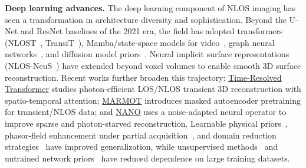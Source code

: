\textbf{Deep learning advances.}
The deep learning component of NLOS imaging has seen a transformation in architecture diversity and sophistication. Beyond the U-Net and ResNet baselines of the 2021 era, the field has adopted transformers (NLOST~\cite{liNLOST2023}, TransiT~\cite{liTransiT2025}), Mamba/state-space models for video~\cite{liMambaTemporalConsistency2024}, graph neural networks~\cite{suDGNLOS2025}, and diffusion model priors~\cite{suModelGuidedDiffusion2024}. Neural implicit surface representations (NLOS-NeuS~\cite{fujimuraNLOSNeuS2023}) have extended beyond voxel volumes to enable smooth 3D surface reconstruction. Recent works further broaden this trajectory: \href{https://arxiv.org/abs/2510.09205}{Time-Resolved Transformer} studies photon-efficient LOS/NLOS transient 3D reconstruction with spatio-temporal attention; \href{https://arxiv.org/abs/2506.08470}{MARMOT} introduces masked autoencoder pretraining for transient/NLOS data; and \href{https://arxiv.org/abs/2508.09655}{NANO} uses a noise-adapted neural operator to improve sparse and photon-starved reconstruction. Learnable physical priors~\cite{sunGeneralizable2025}, phasor-field enhancement under partial acquisition~\cite{choLEAP2024}, and domain reduction strategies~\cite{shimDomainReduction2024} have improved generalization, while unsupervised methods~\cite{cuiVirtualScanning2024} and untrained network priors~\cite{wuUntrainedDecoder2022} have reduced dependence on large training datasets.

